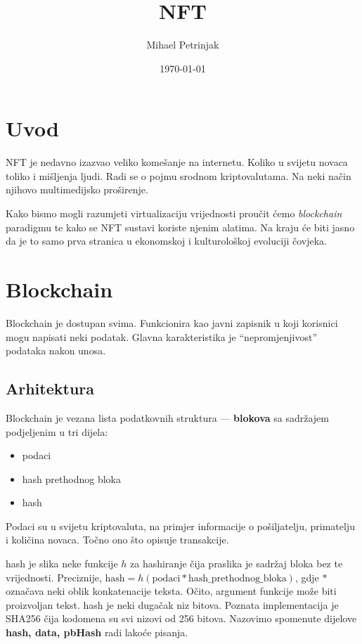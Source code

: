 \documentclass[12pt]{scrartcl} %
\title{NFT}
\author{Mihael Petrinjak}
\date{\today}
\newcommand{\tb}[1]{
\textbf{#1}
}
\newcommand{\tt}[1]{
\text{#1}
}
\begin{document}
\maketitle

\tableofcontents

\newpage

\section{Uvod}
NFT je nedavno izazvao veliko komešanje na internetu. Koliko u svijetu novaca toliko i mišljenja ljudi. Radi se o pojmu srodnom kriptovalutama. Na neki način njihovo multimedijsko proširenje.

Kako bismo mogli razumjeti virtualizaciju vrijednosti proučit ćemo \emph{blockchain} paradigmu te kako se NFT sustavi koriste njenim alatima. Na kraju će biti jasno da je to samo prva stranica u ekonomskoj i kulturološkoj evoluciji čovjeka.

\section{Blockchain}

Blockchain je dostupan svima. Funkcionira kao javni zapisnik u koji korisnici mogu napisati neki podatak. Glavna karakteristika je \enquote{nepromjenjivost} podataka nakon unosa.
\subsection{Arhitektura}
Blockchain je vezana lista podatkovnih struktura --- \tb{blokova} sa sadržajem podjeljenim u tri dijela:
\begin{itemize}
    \item podaci
    \item hash prethodnog bloka
    \item hash
\end{itemize}
Podaci su u svijetu kriptovaluta, na primjer informacije o pošiljatelju, primatelju i količina novaca. Točno ono što opisuje transakcije.

hash je slika neke funkcije $h$ za hashiranje čija praslika je sadržaj bloka bez te vrijednosti. Preciznije, $\tt {hash} = h(\tt {podaci} * \tt {hash\_prethodnog\_bloka})$, gdje $*$ označava neki oblik konkatenacije teksta. Očito, argument funkcije može biti proizvoljan tekst. hash je neki dugačak niz bitova. Poznata implementacija je SHA256 čija kodomena su svi nizovi od 256 bitova. Nazovimo spomenute dijelove \tb{hash, data, pbHash} radi lakoće pisanja.
\end{document}
